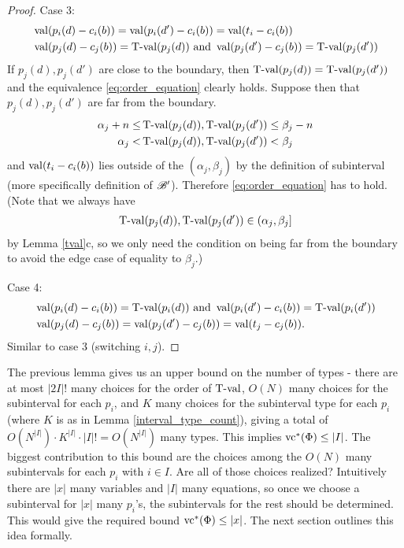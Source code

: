 \begin{proof}
 Case 3:
  \begin{align*}
    &\operatorname{val} (p_i(d) - c_i(b)) = \operatorname{val} (p_i(d') - c_i(b)) = \operatorname{val}(t_i - c_i(b)) \\
    &\operatorname{val} (p_j(d) - c_j(b)) = \operatorname{T-val}(p_j(d)) \text{ and } \operatorname{val} (p_j(d') - c_j(b)) = \operatorname{T-val}(p_j(d'))
  \end{align*}
  If $p_j(d), p_j(d')$ are close to the boundary,
  then $\operatorname{T-val}(p_j(d)) = \operatorname{T-val}(p_j(d'))$ and the equivalence \eqref{eq:order_equation} clearly holds.
  Suppose then that $p_j(d), p_j(d')$ are far from the boundary.
  \begin{align*}
    \alpha_j + n \leq &\operatorname{T-val}(p_j(d)), \operatorname{T-val}(p_j(d')) \leq \beta_j - n \\
    \alpha_j < &\operatorname{T-val}(p_j(d)), \operatorname{T-val}(p_j(d')) < \beta_j
  \end{align*}
  and $\operatorname{val}(t_i - c_i(b))$ lies outside of the $(\alpha_j, \beta_j)$
  by the definition of subinterval (more specifically definition of $\mathscr B'$).
  Therefore \eqref{eq:order_equation} has to hold.
  (Note that we always have
  \begin{align*}
    \operatorname{T-val}(p_j(d)), \operatorname{T-val}(p_j(d')) \in (\alpha_j, \beta_j]
  \end{align*}
   by Lemma \ref{tval}c, so 
  we only need the condition on being far from the boundary to avoid the edge case of equality to $\beta_j$.)

  Case 4:
  \begin{align*}
    &\operatorname{val} (p_i(d) - c_i(b)) = \operatorname{T-val}(p_i(d)) \text{ and } \operatorname{val} (p_i(d') - c_i(b)) = \operatorname{T-val}(p_i(d')) \\
    &\operatorname{val} (p_j(d) - c_j(b)) = \operatorname{val} (p_j(d') - c_j(b)) = \operatorname{val}(t_j - c_j(b)).
  \end{align*}
  Similar to case 3 (switching $i,j$).
\end{proof}



  The previous lemma gives us an upper bound on the number of types - there are at most $|2I|!$ many choices for the order of $\operatorname{T-val}$,
  $O(N)$ many choices for the subinterval for each $p_i$,
  and $K$ many choices for the subinterval type for each $p_i$ (where $K$ is as in Lemma \ref{interval_type_count}),
  giving a total of $O(N^{|I|}) \cdot K^{|I|} \cdot |I|! = O(N^{|I|})$ many types.
  This implies $\operatorname{vc}^*(\Phi) \leq |I|$.
  The biggest contribution to this bound are the choices among the $O(N)$ many subintervals for each $p_i$ with $i \in I$.
  Are all of those choices realized?
  Intuitively there are $|x|$ many variables and $|I|$ many equations,
  so once we choose a subinterval for $|x|$ many $p_i$'s, the subintervals for the rest should be determined.
  This would give the required bound $\operatorname{vc}^*(\Phi) \leq |x|$.
  The next section outlines this idea formally.



